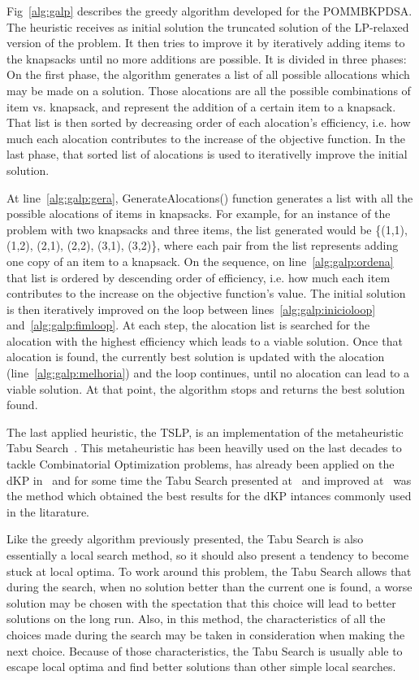 Fig~\ref{alg:galp} describes the greedy algorithm developed for the POMMBKPDSA. The heuristic receives as initial solution 
the truncated solution of the LP-relaxed version of the problem. It then tries to improve it by iteratively adding items to the 
knapsacks until no more additions are possible. It is divided in three phases: On the first phase, the algorithm generates a list
of all possible allocations which may be made on a solution. Those alocations are all the possible combinations of item vs. knapsack, 
and represent the addition of a certain item to a knapsack. That list is then sorted by decreasing order of each alocation's efficiency,
i.e. how much each alocation contributes to the increase of the objective function. In the last phase, that sorted list of alocations
is used to iterativelly improve the initial solution.


At line~\ref{alg:galp:gera}, GenerateAlocations() function generates a list with all the possible alocations of items in knapsacks. 
For example, for an instance of the problem with two knapsacks and three items, the list generated would be \{(1,1), (1,2), (2,1), (2,2), (3,1), (3,2)\},
where each pair from the list represents adding one copy of an item to a knapsack. On the sequence, on line~\ref{alg:galp:ordena} that list is 
ordered by descending order of efficiency, i.e. how much each item contributes to the increase on the objective function's value. The initial solution is 
then iteratively improved on the loop between lines~\ref{alg:galp:inicioloop} 
and~\ref{alg:galp:fimloop}. At each step, the alocation list is searched for the alocation with the highest efficiency which leads to a viable solution.
Once that alocation is found, the currently best solution is updated with the alocation (line~\ref{alg:galp:melhoria}) and the loop continues, until no
alocation can lead to a viable solution. At that point, the algorithm stops and returns the best solution found.

The last applied heuristic, the TSLP, is an implementation of the metaheuristic Tabu Search~\cite{glover1989tabup1}. This metaheuristic has been heavilly used on the
last decades to tackle Combinatorial Optimization problems, has already been applied on the dKP in~\cite{danmeyer1993} and for some time the Tabu Search presented at~\cite{vasquez2001} 
and improved at~\cite{vasquez2005} was the method which obtained the best results for the dKP intances commonly used in the litarature.

Like the greedy algorithm previously presented, the Tabu Search is also essentially a local search method, so it should also present a tendency to 
become stuck at local optima. To work around this problem, the Tabu Search allows that during the search, when no solution better than the current one is found,
a worse solution may be chosen with the spectation that this choice will lead to better solutions on the long run. Also, in this method, the characteristics
of all the choices made during the search may be taken in consideration when making the next choice. Because of those characteristics, the Tabu Search is usually
able to escape local optima and find better solutions than other simple local searches.

